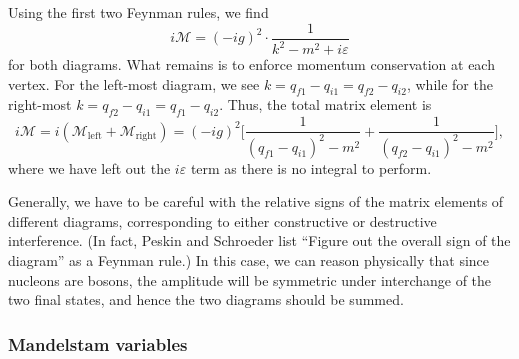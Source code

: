 Using the first two Feynman rules, we find
\begin{equation}
	\label{eq:01_qft_interactions_nn_scattering_1}
	i \mathcal M = (-ig)^2 \cdot  \frac{1}{k^2 - m^2 + i\varepsilon}
\end{equation}
for both diagrams.
What remains is to enforce momentum conservation at each vertex.
For the left-most diagram, we see $k = q_{f1} - q_{i1} = q_{f2} - q_{i2}$, while for the right-most $k = q_{f2} - q_{i1} = q_{f1} - q_{i2}$.
Thus, the total matrix element is
\begin{equation}
	\label{eq:01_qft_interactions_nn_scattering_2}
	i \mathcal M = i(\mathcal M_{\mathrm{left}} + \mathcal M_{\mathrm{right}}) = (-ig)^2 \bigg[ \frac{1}{(q_{f1} - q_{i1})^2 - m^2} + \frac{1}{(q_{f2} - q_{i1})^2 - m^2} \bigg],
\end{equation}
where we have left out the $i\varepsilon$ term as there is no integral to perform.

Generally, we have to be careful with the relative signs of the matrix elements of different diagrams, corresponding to either constructive or destructive interference.
(In fact, Peskin and Schroeder list ``Figure out the overall sign of the diagram'' as a Feynman rule.)
In this case, we can reason physically that since nucleons are bosons, the amplitude will be symmetric under interchange of the two final states, and hence the two diagrams should be summed.

\subsubsection{Mandelstam variables}

